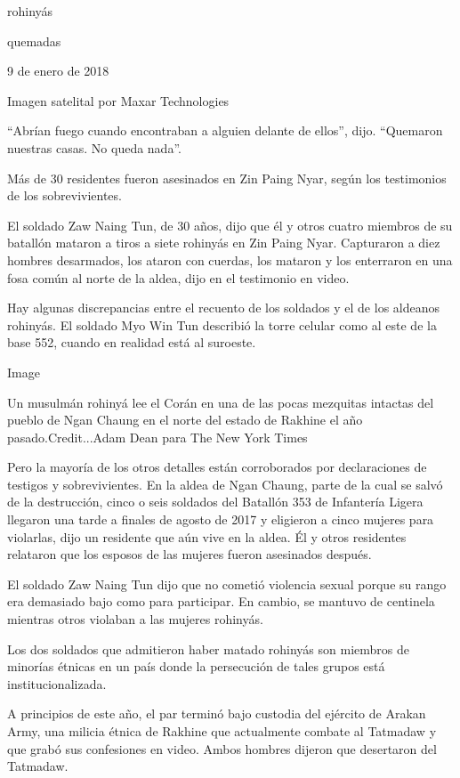 rohinyás

quemadas

9 de enero de 2018

Imagen satelital por Maxar Technologies

``Abrían fuego cuando encontraban a alguien delante de ellos'', dijo.
``Quemaron nuestras casas. No queda nada''.

Más de 30 residentes fueron asesinados en Zin Paing Nyar, según los
testimonios de los sobrevivientes.

El soldado Zaw Naing Tun, de 30 años, dijo que él y otros cuatro
miembros de su batallón mataron a tiros a siete rohinyás en Zin Paing
Nyar. Capturaron a diez hombres desarmados, los ataron con cuerdas, los
mataron y los enterraron en una fosa común al norte de la aldea, dijo en
el testimonio en video.

Hay algunas discrepancias entre el recuento de los soldados y el de los
aldeanos rohinyás. El soldado Myo Win Tun describió la torre celular
como al este de la base 552, cuando en realidad está al suroeste.

Image

Un musulmán rohinyá lee el Corán en una de las pocas mezquitas intactas
del pueblo de Ngan Chaung en el norte del estado de Rakhine el año
pasado.Credit...Adam Dean para The New York Times

Pero la mayoría de los otros detalles están corroborados por
declaraciones de testigos y sobrevivientes. En la aldea de Ngan Chaung,
parte de la cual se salvó de la destrucción, cinco o seis soldados del
Batallón 353 de Infantería Ligera llegaron una tarde a finales de agosto
de 2017 y eligieron a cinco mujeres para violarlas, dijo un residente
que aún vive en la aldea. Él y otros residentes relataron que los
esposos de las mujeres fueron asesinados después.

El soldado Zaw Naing Tun dijo que no cometió violencia sexual porque su
rango era demasiado bajo como para participar. En cambio, se mantuvo de
centinela mientras otros violaban a las mujeres rohinyás.

Los dos soldados que admitieron haber matado rohinyás son miembros de
minorías étnicas en un país donde la persecución de tales grupos está
institucionalizada.

A principios de este año, el par terminó bajo custodia del ejército de
Arakan Army, una milicia étnica de Rakhine que actualmente combate al
Tatmadaw y que grabó sus confesiones en video. Ambos hombres dijeron que
desertaron del Tatmadaw.

